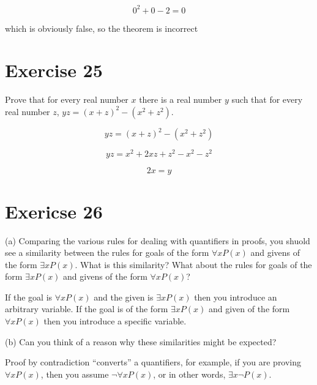 \documentclass[11pt]{article}
\begin{document}
$$0^2 + 0 - 2 = 0$$ 

which is obviously false, so the theorem is incorrect

\section*{Exercise 25}

Prove that for every real number $x$ there is a real number $y$ such that for 
every real number $z$, $yz = (x + z)^2 - (x^2 + z^2)$.

$$yz = (x + z)^2 - (x^2 + z^2)$$

$$yz = x^2 + 2xz + z^2 -x^2 - z^2$$

$$2x = y$$

\section*{Exericse 26}

\noindent (a) Comparing the various rules for dealing with quantifiers in proofs,
you shuold see a similarity between the rules for goals of the form 
$\forall x P(x)$ and givens of the form $\exists x P(x)$. What is this 
similarity? What about the rules for goals of the form $\exists x P(x)$ and
givens of the form $\forall x P(x)$?

If the goal is $\forall x P(x)$ and the given is $\exists x P(x)$ then you
introduce an arbitrary variable. If the goal is of the form $\exists x P(x)$ and
given of the form $\forall x P(x)$ then you introduce a specific variable.

\noindent (b) Can you think of a reason why these similarities might be expected?

Proof by contradiction ``converts'' a quantifiers, for example, if you are 
proving $\forall x P(x)$, then you assume $\neg \forall x P(x)$, or in other
words, $\exists x \neg P(x)$.
\end{document}
